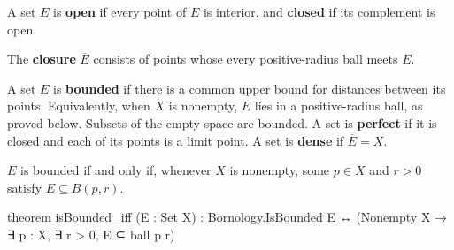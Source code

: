 \begin{definition}
  \label{an1:def:open-closed-sets}
  A set $E$ is \textbf{open} if every point of $E$ is interior, and \textbf{closed} if its
  complement is open.
\end{definition}

\begin{definition}
  \label{an1:def:closure}
  The \textbf{closure} $\overline E$ consists of points whose every positive-radius ball meets
  $E$.
\end{definition}

\begin{definition}
  \label{an1:def:bounded-perfect-dense-sets}
  A set $E$ is \textbf{bounded} if there is a common upper bound for distances between its points.
  Equivalently, when $X$ is nonempty, $E$ lies in a positive-radius ball, as proved below.
  Subsets of the empty space are bounded.
  A set is \textbf{perfect} if it is closed and each of its points is a limit point.
  A set is \textbf{dense} if $\overline E=X$.
\end{definition}

\begin{lemma}
  \label{an1:lem:isBounded-iff}
  $E$ is bounded if and only if, whenever $X$ is nonempty, some $p\in X$ and $r>0$ satisfy $E\subseteq B(p,r)$.

  \begin{lean}
    theorem isBounded_iff (E : Set X) :
        Bornology.IsBounded E ↔ (Nonempty X → ∃ p : X, ∃ r > 0, E ⊆ ball p r)
  \end{lean}
\end{lemma}

